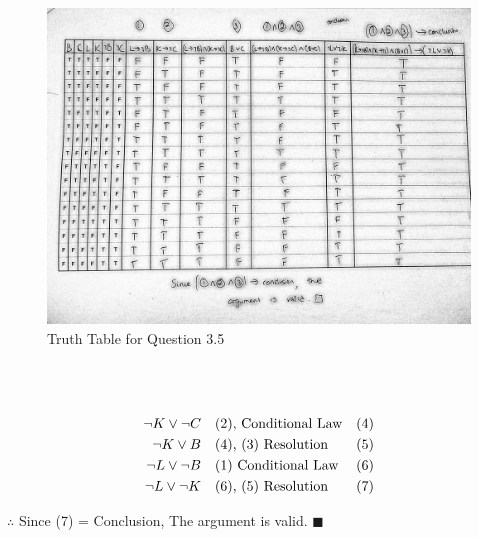 \documentclass[]{article}
\begin{document}
\begin{figure}[h!]
    \begin{center}
        \includegraphics[totalheight=10cm]{images/Q3P5.jpg}
        
    \end{center}
    \caption{Truth Table for Question 3.5}
\end{figure}


\begin{center}
     \\
    \\
\end{center}
\begin{align*}
    \neg K \lor \neg C \quad & \text{(2), Conditional Law} \hfill & \text{(4)} \\
    \neg K \lor B \quad & \text{(4), (3) Resolution} \hfill & \text{(5)} \\
    \neg L \lor \neg B \quad & \text{(1) Conditional Law} \hfill & \text{(6)} \\
    \neg L \lor \neg K \quad & \text{(6), (5) Resolution} \hfill & \text{(7)} \\
\end{align*}
\begin{center}
    $\therefore$ Since (7) = Conclusion, The argument is valid. $\blacksquare$
\end{center}
\end{document}

